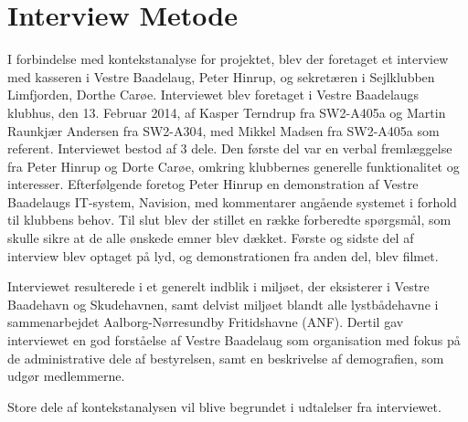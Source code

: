 \chapter{Interview Metode}

I forbindelse med kontekstanalyse for projektet, blev der foretaget et interview med kasseren i Vestre Baadelaug, Peter Hinrup, og sekretæren i Sejlklubben Limfjorden, Dorthe Carøe. Interviewet blev foretaget i Vestre Baadelaugs klubhus, den 13. Februar 2014, af Kasper Terndrup fra SW2-A405a og Martin Raunkjær Andersen fra SW2-A304, med Mikkel Madsen fra SW2-A405a som referent. Interviewet bestod af 3 dele. Den første del var en verbal fremlæggelse fra Peter Hinrup og Dorte Carøe, omkring klubbernes generelle funktionalitet og interesser. Efterfølgende foretog Peter Hinrup en demonstration af Vestre Baadelaugs IT-system, Navision, med kommentarer angående systemet i forhold til klubbens behov. Til slut blev der stillet en række forberedte spørgsmål, som skulle sikre at de alle ønskede emner blev dækket. Første og sidste del af interview blev optaget på lyd, og demonstrationen fra anden del, blev filmet.

Interviewet resulterede i et generelt indblik i miljøet, der eksisterer i Vestre Baadehavn og Skudehavnen, samt delvist miljøet blandt alle lystbådehavne i sammenarbejdet Aalborg-Nørresundby Fritidshavne (ANF). Dertil gav interviewet en god forståelse af Vestre Baadelaug som organisation med fokus på de administrative dele af bestyrelsen, samt en beskrivelse af demografien, som udgør medlemmerne.

Store dele af kontekstanalysen vil blive begrundet i udtalelser fra interviewet.

